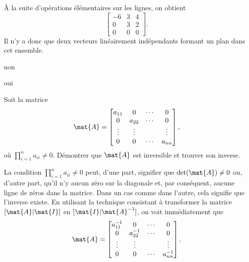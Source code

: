 \begin{exercice}
\begin{sol}
\begin{enumerate}
      À la suite d'opérations élémentaires sur les lignes, on obtient
      \begin{displaymath}
        \begin{bmatrix}
          -6 & 3 & 4 \\ 0 & 3 & 2 \\ 0 & 0 & 0
        \end{bmatrix}.
      \end{displaymath}
      Il n'y a donc que deux vecteurs linéairement indépendants
      formant un plan dans cet ensemble.
    \end{enumerate}
  \end{sol}
  \begin{rep}
    \begin{inparaenum}
    \item non
    \item oui
    \end{inparaenum}
  \end{rep}
\end{exercice}

\begin{exercice}
  \label{ex:revision:inverse_diagonale}
  Soit la matrice
  \begin{displaymath}
    \mat{A} =
    \begin{bmatrix}
      a_{11} &      0 & \cdots &      0 \\
           0 & a_{22} & \cdots &      0 \\
      \vdots & \vdots &        & \vdots \\
           0 &      0 & \cdots & a_{nn}
    \end{bmatrix},
  \end{displaymath}
  où $\prod_{i=1}^n a_{ii} \neq 0$. Démontrer que $\mat{A}$ est
  inversible et trouver son inverse.
  \begin{sol}
    La condition $\prod_{i=1}^n a_{ii} \neq 0$ peut, d'une part,
    signifier que $\det(\mat{A}) \neq 0$ ou, d'autre part, qu'il n'y
    aucun zéro sur la diagonale et, par conséquent, aucune ligne de
    zéros dans la matrice. Dans un cas comme dans l'autre, cela
    signifie que l'inverse existe. En utilisant la technique
    consistant à transformer la matrice $[\mat{A}|\mat{I}]$ en
    $[\mat{I}|\mat{A}^{-1}]$, on voit immédiatement que
    \begin{displaymath}
      \mat{A} =
      \begin{bmatrix}
        a_{11}^{-1} &          0 & \cdots &      0 \\
                 0 & a_{22}^{-1} & \cdots &      0 \\
            \vdots &     \vdots &        & \vdots \\
                 0 &          0 & \cdots & a_{nn}^{-1}
      \end{bmatrix}.
    \end{displaymath}
  \end{sol}
\end{exercice}

